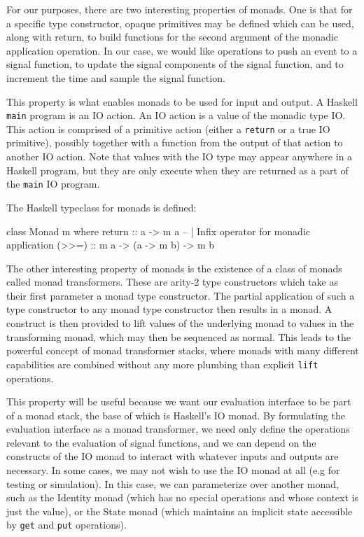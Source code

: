\documentclass[draft]{llncs}
\begin{document}
For our purposes, there are two interesting properties of monads. One is that
for a specific type constructor, opaque primitives may be defined which
can be used, along with return, to build functions for the second argument
of the monadic application operation. In our case, we would like operations
to push an event to a signal function, to update the signal components of
the signal function, and to increment the time and sample the signal function.

This property is what enables monads to be used for input and output. A Haskell
{\tt main} program is an IO action. An IO action is a value of the monadic type
IO. This action is comprised of a primitive action (either a {\tt return} or a 
true IO primitive), possibly together with a function from the output of that
action to another IO action. Note that values with the IO type may appear
anywhere in a Haskell program, but they are only execute when they are returned
as a part of the {\tt main} IO program.

The Haskell typeclass for monads is defined:

\begin{code}
class Monad m where
  return :: a -> m a
  -- | Infix operator for monadic application
  (>>=)  :: m a -> (a -> m b) -> m b 
\end{code}

The other interesting property of monads is the existence of a class of monads
called monad transformers. These are arity-2 type constructors which take as
their first parameter a monad type constructor. The partial application of
such a type constructor to any monad type constructor then results in a monad.
A construct is then provided to lift values of the underlying monad to values
in the transforming monad, which may then be sequenced as normal. This leads
to the powerful concept of monad transformer stacks, where monads with many
different capabilities are combined without any more plumbing than explicit
{\tt lift} operations. 

This property will be useful because we want our evaluation interface to be
part of a monad stack, the base of which is Haskell's IO monad. By formulating
the evaluation interface as a monad transformer, we need only define the
operations relevant to the evaluation of signal functions, and we can depend
on the constructs of the IO monad to interact with whatever inputs and outputs
are necessary. In some cases, we may not wish to use the IO monad at all (e.g
for testing or simulation). In this case, we can parameterize over another
monad, such as the Identity monad (which has no special operations and whose
context is just the value), or the State monad (which maintains an implicit 
state accessible by {\tt get} and {\tt put} operations).
\end{document}

